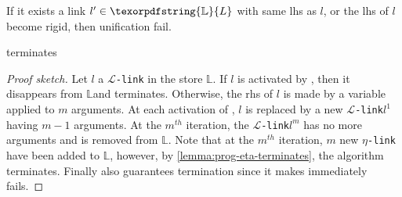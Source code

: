 \documentclass[sigconf,natbib=false,review]{acmart}
\newcommand{\llambda}{\ensuremath{\mathcal{L}}\xspace}
\newcommand{\linkMacro}[1]{\ensuremath{#1}\texttt{-link}\xspace}
\newcommand{\linkbeta}{\linkMacro{\llambda}}
\newcommand{\linketa} {\linkMacro{\eta}}
\newcommand{\lhs}{lhs\xspace}
\newcommand{\rhs}{rhs\xspace}
\newcommand{\linkStore}{\texorpdfstring{\ensuremath{\mathbb{L}}\xspace}{L}}
\begin{document}
\begin{definition}[\progBetaFail]
  If it exists a link $l' \in \linkStore$ with same \lhs as $l$, or the \lhs 
  of $l$ become rigid, then unification fail.
  \label{def:progBetaFail}
\end{definition}

\begin{lemma}
   terminates
\end{lemma}

\begin{proof}[Proof sketch]
  Let $l$ a \linkbeta in the store \linkStore. If $l$ is activated by
  \progBetaRH{}, then it disappears from \linkStore and 
  terminates. Otherwise, the \rhs of $l$ is made by a variable applied to $m$
  arguments. At each activation of \progBetaLL, $l$ is replaced by a new
  \linkbeta $l^1$ having $m-1$ arguments. At the $m^{th}$ iteration, the
  \linkbeta $l^m$ has no more arguments and is removed from \linkStore.
  Note that at the $m^{th}$ iteration, $m$ new \linketa have been added to
  \linkStore, however, by \cref{lemma:prog-eta-terminates}, the algorithm
  terminates. Finally \progBetaFail also guarantees termination since 
  it makes  immediately fails.

\end{proof}

\end{document}
